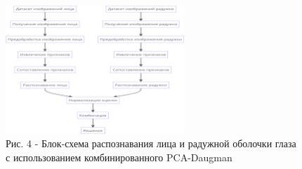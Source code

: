 \begin{figure}[H]
	\centering
	\includegraphics[width=0.6\textwidth]{assets/86}
	\caption*{Рис. 4 - Блок-схема распознавания лица и радужной оболочки глаза с использованием комбинированного PCA-Daugman}
\end{figure}

